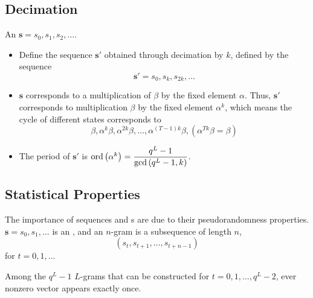\subsection{Decimation}\label{subsec:Decimation}
An  $\mathbf{s} = s_{0}, s_{1}, s_{2}, \ldots$.
\begin{itemize}[noitemsep]
\item Define the sequence $\mathbf{s}'$ obtained through decimation by $k$, defined by the sequence
  \begin{equation*}
    \mathbf{s}' = s_{0}, s_{k}, s_{2k}, \ldots
  \end{equation*}
\item $\mathbf{s}$ corresponds to a multiplication of $\beta$ by the fixed element $\alpha$. Thus, $\mathbf{s}'$ corresponds to multiplication $\beta$ by the fixed element $\alpha^{k}$, which means the cycle of different states corresponds to
  \begin{equation*}
    \beta, \alpha^{k}\beta, \alpha^{2k}\beta, \ldots, \alpha^{(T-1)k}\beta, \left( \alpha^{Tk}\beta = \beta \right)
  \end{equation*}
\item The period of $\mathbf{s}'$ is $\operatorname{\operatorname{ord}} \left( \alpha^{k} \right) = \dfrac{q^{L}-1}{\gcd \left( q^{L}-1, k \right)}$.
\end{itemize}

\subsection{Statistical Properties}\label{subsec:LFSR_Statistical_Properties}
The importance of  sequences and s are due to their pseudorandomness properties.
$\mathbf{s} = s_{0}, s_{1}, \ldots$ is an , and an $n$-gram is a subsequence of length $n$,
\begin{equation*}
  \left( s_{t}, s_{t+1}, \ldots, s_{t+n-1} \right)
\end{equation*}
for $t=0, 1, \ldots$

\begin{theorem}
  Among the $q^{L}-1$ $L$-grams that can be constructed for $t = 0, 1, \ldots, q^{L}-2$, ever nonzero vector appears exactly once.
\end{theorem}

